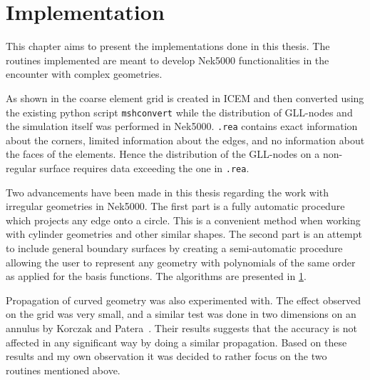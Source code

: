 
\chapter{Implementation} %

\label{implementation} %






This chapter aims to present the implementations done in this thesis. 
The routines implemented are meant to develop Nek5000 functionalities 
in the encounter with complex geometries. 

As shown in  the coarse element grid is created
in ICEM and then converted using the existing python script \verb|mshconvert| while the
distribution of GLL-nodes and the simulation itself was performed in Nek5000.
\verb|.rea| contains exact information about the corners,
limited information about the edges, and no information about the faces of the elements.
Hence the distribution of the GLL-nodes on a non-regular surface requires data exceeding the one in \verb|.rea|.

Two advancements have been made in this thesis regarding the work with irregular geometries in Nek5000.
The first part is a fully automatic procedure which projects any edge onto a circle. This is a
convenient method when working with cylinder geometries and other similar shapes. The second part
is an attempt to include general boundary surfaces by creating a semi-automatic procedure allowing 
the user to represent any geometry with polynomials of the same order as applied for the basis functions.
The algorithms are presented in \cref{implementation}. 

Propagation of curved geometry was also experimented with. 
The effect observed on the grid was very small, and a similar test was 
done in two dimensions on an annulus by Korczak and Patera~\cite{Patera1986}. 
Their results suggests that the accuracy is not affected in any significant way 
by doing a similar propagation. Based on these results and my own observation 
it was decided to rather focus on the two routines mentioned above.

